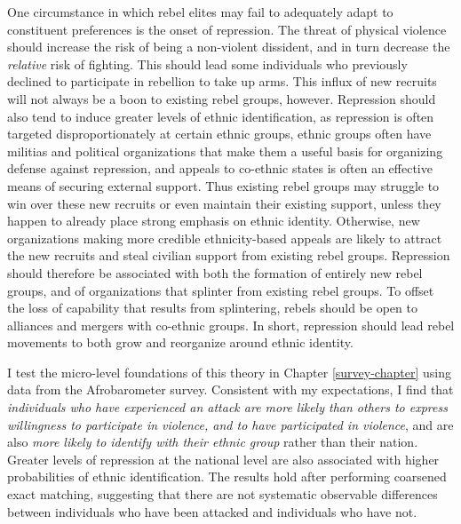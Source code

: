 \documentclass[12pt,]{book}
\theoremstyle{definition}
\theoremstyle{definition}
\theoremstyle{definition}
\theoremstyle{remark}
\begin{document}
One circumstance in which rebel elites may fail to adequately adapt to
constituent preferences is the onset of repression. The threat of
physical violence should increase the risk of being a non-violent
dissident, and in turn decrease the \emph{relative} risk of fighting.
This should lead some individuals who previously declined to participate
in rebellion to take up arms. This influx of new recruits will not
always be a boon to existing rebel groups, however. Repression should
also tend to induce greater levels of ethnic identification, as
repression is often targeted disproportionately at certain ethnic
groups, ethnic groups often have militias and political organizations
that make them a useful basis for organizing defense against repression,
and appeals to co-ethnic states is often an effective means of securing
external support. Thus existing rebel groups may struggle to win over
these new recruits or even maintain their existing support, unless they
happen to already place strong emphasis on ethnic identity. Otherwise,
new organizations making more credible ethnicity-based appeals are
likely to attract the new recruits and steal civilian support from
existing rebel groups. Repression should therefore be associated with
both the formation of entirely new rebel groups, and of organizations
that splinter from existing rebel groups. To offset the loss of
capability that results from splintering, rebels should be open to
alliances and mergers with co-ethnic groups. In short, repression should
lead rebel movements to both grow and reorganize around ethnic identity.

I test the micro-level foundations of this theory in Chapter
\ref{survey-chapter} using data from the Afrobarometer survey.
Consistent with my expectations, I find that \emph{individuals who have
experienced an attack are more likely than others to express willingness
to participate in violence, and to have participated in violence}, and
are also \emph{more likely to identify with their ethnic group} rather
than their nation. Greater levels of repression at the national level
are also associated with higher probabilities of ethnic identification.
The results hold after performing coarsened exact matching, suggesting
that there are not systematic observable differences between individuals
who have been attacked and individuals who have not.
\end{document}
